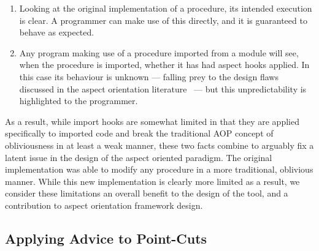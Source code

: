 \begin{enumerate}
    \item Looking at the original implementation of a procedure, its intended
    execution is clear. A programmer can make use of this directly, and it is
    guaranteed to behave as expected.
    \item Any program making use of a procedure imported from a module will see,
    when the procedure is imported, whether it has had aspect hooks applied. In
    this case its behaviour is unknown --- falling prey to the design flaws
    discussed in the aspect orientation
    literature~\cite{Constantinides04aopconsidered,steimann06paradoxical,przybylek2010wrong}
    --- but this unpredictability is highlighted to the
    programmer.
\end{enumerate}

    
As a result, while import hooks are somewhat limited in that they are applied
specifically to imported code and break the traditional AOP concept of
obliviousness in at least a weak manner, these two facts combine to arguably fix
a latent issue in the design of the aspect oriented paradigm. The original
\pdsf{} implementation was able to modify any procedure in a more traditional,
oblivious manner. While this new implementation is clearly more limited as a
result, we consider these limitations an overall benefit to the design of the
tool, and a contribution to aspect orientation framework design.


\subsection{Applying Advice to Point-Cuts}\label{subsec:pdsf3_weaving_process}

